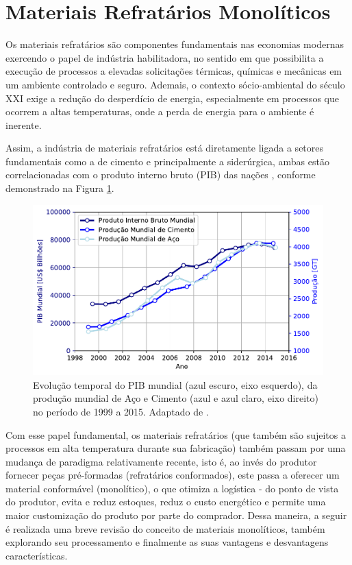 
\section{Materiais Refratários Monolíticos}\label{mono}

Os materiais refratários são componentes fundamentais nas economias modernas
exercendo o papel de indústria habilitadora, no sentido em que possibilita a
execução de processos a elevadas solicitações térmicas, químicas e mecânicas em
um ambiente controlado e seguro. Ademais, o contexto sócio-ambiental do século
XXI exige a redução do desperdício de energia, especialmente em processos que
ocorrem a altas temperaturas, onde a perda de energia para o ambiente é
inerente.

Assim, a indústria de materiais refratários está diretamente ligada a setores
fundamentais como a de cimento e principalmente a siderúrgica, ambas estão
correlacionadas com o produto interno bruto (PIB) das nações
\cite{Ravazzolo2017, Bordigoni2016, Dobrota2013}, conforme demonstrado na Figura
\ref{fig:refractory_economy}.

\begin{figure}[!ht]
\centering
\includegraphics[width=\linewidth]{./figures/refractory_economy.pdf}
\caption{Evolução temporal do PIB mundial (azul escuro, eixo esquerdo), da
  produção mundial de Aço e Cimento (azul e azul claro, eixo direito) no período
  de 1999 a 2015. Adaptado de
  \cite{GlobalRef2017}. \label{fig:refractory_economy}}
\end{figure}

Com esse papel fundamental, os materiais refratários (que também são sujeitos a
processos em alta temperatura durante sua fabricação) também passam por uma
mudança de paradigma relativamente recente, isto é, ao invés do produtor
fornecer peças pré-formadas (refratários conformados), este passa a oferecer um
material conformável (monolítico), o que otimiza a logística - do ponto de vista
do produtor, evita e reduz estoques, reduz o custo energético e permite uma
maior customização do produto por parte do comprador. Dessa maneira, a seguir é
realizada uma breve revisão do conceito de materiais monolíticos, também
explorando seu processamento e finalmente as suas vantagens e desvantagens
características.

